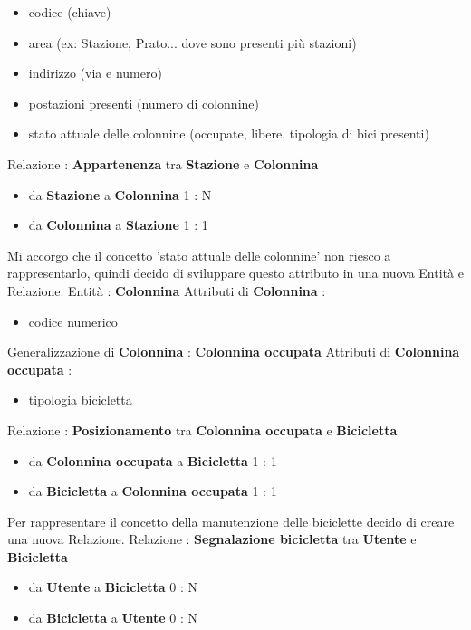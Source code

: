 \documentclass[a4paper,twoside]{article}
\begin{document}
\begin{itemize}
 \item codice (chiave)
 \item area (ex: Stazione, Prato... dove sono presenti più stazioni)
 \item indirizzo (via e numero)
 \item postazioni presenti (numero di colonnine)
 \item stato attuale delle colonnine (occupate, libere, tipologia di bici presenti)
 \end{itemize}
Relazione : \textbf{Appartenenza} tra \textbf{Stazione} e \textbf{Colonnina}
\begin{itemize}
 \item da \textbf{Stazione} a \textbf{Colonnina} 1 : N
 \item da \textbf{Colonnina} a \textbf{Stazione} 1 : 1
\end{itemize}
Mi accorgo che il concetto 'stato attuale delle colonnine' non riesco a rappresentarlo, quindi decido di sviluppare questo attributo in una nuova Entità e Relazione.\newline
Entità : \textbf{Colonnina}\newline
Attributi di \textbf{Colonnina} :
\begin{itemize}
 \item codice numerico
\end{itemize}
Generalizzazione di \textbf{Colonnina} : \textbf{Colonnina occupata}\newline
Attributi di \textbf{Colonnina occupata} :
\begin{itemize}
 \item tipologia bicicletta
\end{itemize}
Relazione : \textbf{Posizionamento} tra \textbf{Colonnina occupata} e \textbf{Bicicletta}
\begin{itemize}
 \item da \textbf{Colonnina occupata} a \textbf{Bicicletta} 1 : 1
 \item da \textbf{Bicicletta} a \textbf{Colonnina occupata} 1 : 1
\end{itemize}
Per rappresentare il concetto della manutenzione delle biciclette decido di creare una nuova Relazione.\newline
Relazione : \textbf{Segnalazione bicicletta} tra \textbf{Utente} e \textbf{Bicicletta}
\begin{itemize}
 \item da \textbf{Utente} a \textbf{Bicicletta} 0 : N
 \item da \textbf{Bicicletta} a \textbf{Utente} 0 : N
\end{itemize}
\end{document}
